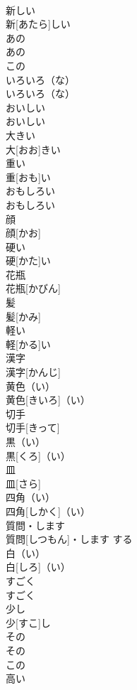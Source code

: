 \documentclass[8pt]{extreport}
\begin{document}
\begin{CJK}{UTF8}{min}
\\	新しい	
\\	新[あたら]しい		
\\	あの	
\\	あの	
\\	この 
\\	いろいろ（な）	
\\	いろいろ（な）		
\\	おいしい	
\\	おいしい		
\\	大きい	
\\	大[おお]きい		
\\	重い	
\\	重[おも]い		
\\	おもしろい	
\\	おもしろい		
\\	顔	
\\	顔[かお]		
\\	硬い	
\\	硬[かた]い		
\\	花瓶	
\\	花瓶[かびん]		
\\	髪	
\\	髪[かみ]		
\\	軽い	
\\	軽[かる]い		
\\	漢字	
\\	漢字[かんじ]		
\\	黄色（い）	
\\	黄色[きいろ]（い）		
\\	切手	
\\	切手[きって]		
\\	黒（い）	
\\	黒[くろ]（い）		
\\	皿	
\\	皿[さら]		
\\	四角（い）	
\\	四角[しかく]（い）		
\\	質問・します	
\\	質問[しつもん]・します	する	
\\	白（い）	
\\	白[しろ]（い）		
\\	すごく	
\\	すごく		
\\	少し	
\\	少[すこ]し		
\\	その	
\\	その	
\\	この 
\\	高い	

\end{CJK}
\end{document}
